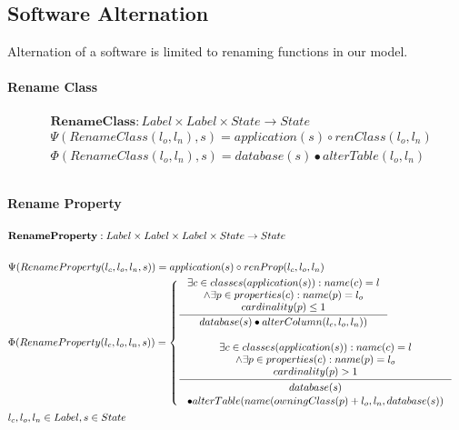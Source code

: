 \documentclass[11pt]{article}
\begin{document}
\subsection{Software Alternation}
Alternation of a software is limited to renaming functions in our model.
\paragraph{Rename Class}
\begin{align*}
& \mathbf{RenameClass} : Label \times Label \times State \rightarrow State \\ 
& \Psi(RenameClass(l_o, l_n), s) = application(s) \circ renClass(l_o, l_n) \\
& \Phi(RenameClass(l_o, l_n), s) = database(s) \bullet alterTable(l_o, l_n) \\ \\
\end{align*}

\paragraph{Rename Property}
\begin{align*}
&	\mathbf{RenameProperty} : Label \times Label \times Label \times State \rightarrow State \\ \\
& \Psi(RenameProperty(l_c, l_o, l_n, s)) = application(s) \circ renProp(l_c, l_o, l_n) \\
& \Phi(RenameProperty(l_c, l_o, l_n, s)) = \begin{cases}
 	\inference{\exists c \in classes(application(s)) : name(c) = l\\ 
		\wedge \exists p \in properties(c) : name(p) = l_o \\
 	cardinality(p) \leq 1}{database(s) \bullet alterColumn(l_c, l_o, l_n))} \\\\
 	\inference{\exists c \in classes(application(s)) : name(c) = l\\ 
		\wedge \exists p \in properties(c) : name(p) = l_o \\
 	cardinality(p) > 1}{\begin{gathered}
		database(s)\\ \bullet alterTable(name(owningClass(p)+l_o, l_n, database(s))
\end{gathered}}
 \end{cases}\\
& l_c, l_o, l_n \in Label,  s \in State
\end{align*}
\end{document}
